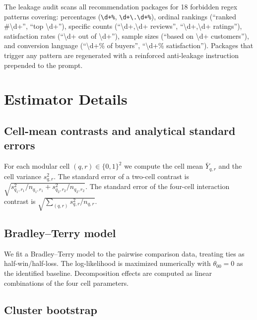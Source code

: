 \documentclass[11pt]{article}
\newcommand{\Y}{Y}
\begin{document}
The leakage audit scans all recommendation packages for 18 forbidden regex patterns covering: percentages (\texttt{\textbackslash d+\%}, \texttt{\textbackslash d+\textbackslash.\textbackslash d+\%}), ordinal rankings (``ranked \#\textbackslash d+'', ``top \textbackslash d+''), specific counts (``\textbackslash d+,\textbackslash d+ reviews'', ``\textbackslash d+,\textbackslash d+ ratings''), satisfaction rates (``\textbackslash d+ out of \textbackslash d+''), sample sizes (``based on \textbackslash d+ customers''), and conversion language (``\textbackslash d+\% of buyers'', ``\textbackslash d+\% satisfaction''). Packages that trigger any pattern are regenerated with a reinforced anti-leakage instruction prepended to the prompt.

\section{Estimator Details}\label{section:estimators}

\subsection{Cell-mean contrasts and analytical standard errors}

For each modular cell $(q, r) \in \{0, 1\}^2$ we compute the cell mean $\bar{\Y}_{q, r}$ and the cell variance $s^2_{q, r}$. The standard error of a two-cell contrast is $\sqrt{s^2_{q_1, r_1} / n_{q_1, r_1} + s^2_{q_2, r_2} / n_{q_2, r_2}}$. The standard error of the four-cell interaction contrast is $\sqrt{\sum_{(q, r)} s^2_{q, r} / n_{q, r}}$.

\subsection{Bradley--Terry model}

We fit a Bradley--Terry model to the pairwise comparison data, treating ties as half-win/half-loss. The log-likelihood is maximized numerically with $\theta_{00} = 0$ as the identified baseline. Decomposition effects are computed as linear combinations of the four cell parameters.

\subsection{Cluster bootstrap}
\end{document}
